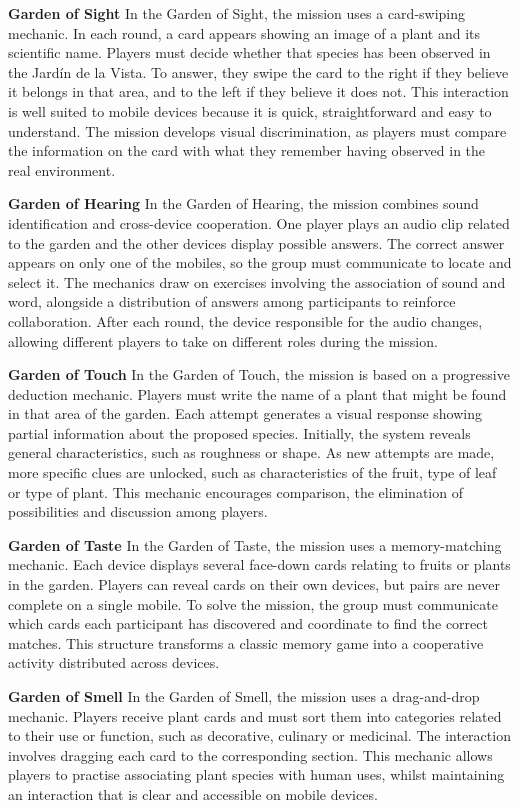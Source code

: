 \textbf{Garden of Sight}
In the Garden of Sight, the mission uses a card-swiping mechanic. In each round, a card appears showing an image of a plant and its scientific name. Players must decide whether that species has been observed in the Jardín de la Vista. To answer, they swipe the card to the right if they believe it belongs in that area, and to the left if they believe it does not. This interaction is well suited to mobile devices because it is quick, straightforward and easy to understand. The mission develops visual discrimination, as players must compare the information on the card with what they remember having observed in the real environment.

\textbf{Garden of Hearing}
In the Garden of Hearing, the mission combines sound identification and cross-device cooperation. One player plays an audio clip related to the garden and the other devices display possible answers. The correct answer appears on only one of the mobiles, so the group must communicate to locate and select it. The mechanics draw on exercises involving the association of sound and word, alongside a distribution of answers among participants to reinforce collaboration. After each round, the device responsible for the audio changes, allowing different players to take on different roles during the mission.

\textbf{Garden of Touch}
In the Garden of Touch, the mission is based on a progressive deduction mechanic. Players must write the name of a plant that might be found in that area of the garden. Each attempt generates a visual response showing partial information about the proposed species. Initially, the system reveals general characteristics, such as roughness or shape. As new attempts are made, more specific clues are unlocked, such as characteristics of the fruit, type of leaf or type of plant. This mechanic encourages comparison, the elimination of possibilities and discussion among players.

\textbf{Garden of Taste}
In the Garden of Taste, the mission uses a memory-matching mechanic. Each device displays several face-down cards relating to fruits or plants in the garden. Players can reveal cards on their own devices, but pairs are never complete on a single mobile. To solve the mission, the group must communicate which cards each participant has discovered and coordinate to find the correct matches. This structure transforms a classic memory game into a cooperative activity distributed across devices.

\textbf{Garden of Smell}
In the Garden of Smell, the mission uses a drag-and-drop mechanic. Players receive plant cards and must sort them into categories related to their use or function, such as decorative, culinary or medicinal. The interaction involves dragging each card to the corresponding section. This mechanic allows players to practise associating plant species with human uses, whilst maintaining an interaction that is clear and accessible on mobile devices.

